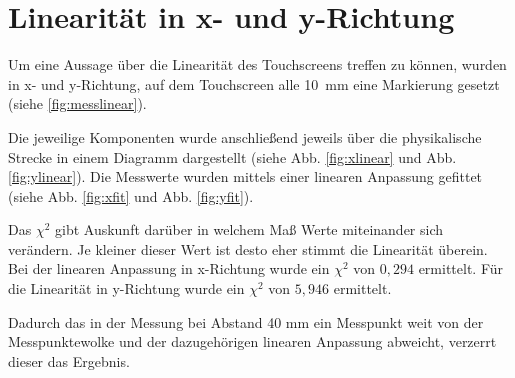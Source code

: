 \section{Linearität in x- und y-Richtung}
\label{ab:linear}
Um eine Aussage über die Linearität des Touchscreens treffen zu können, wurden in x- und y-Richtung, auf dem Touchscreen alle \SI{10}{mm} eine Markierung gesetzt (siehe \ref{fig:messlinear}).

Die jeweilige Komponenten wurde anschließend jeweils über die physikalische Strecke in einem Diagramm dargestellt (siehe Abb. \ref{fig:xlinear} und Abb. \ref{fig:ylinear}). 
Die Messwerte wurden mittels einer linearen Anpassung gefittet (siehe Abb. \ref{fig:xfit} und Abb. \ref{fig:yfit}).

Das \(\chi^2\) gibt Auskunft darüber in welchem Maß Werte miteinander sich verändern. 
Je kleiner dieser Wert ist desto eher stimmt die Linearität überein. Bei der linearen Anpassung in x-Richtung wurde ein \(\chi^2\) von \(0,294\) ermittelt. Für die Linearität in y-Richtung wurde ein \(\chi^2\) von \(5,946\) ermittelt.

Dadurch das in der Messung bei Abstand 40 mm ein Messpunkt weit von der Messpunktewolke und der dazugehörigen linearen Anpassung abweicht, verzerrt dieser das Ergebnis.

